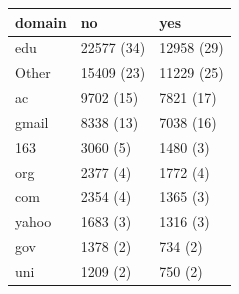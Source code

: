 \begin{table}[ht]
\centering
\begin{tabular}{lll}
 domain & no & yes \\ 
  \hline
edu & 22577 (34) & 12958 (29) \\ 
  Other & 15409 (23) & 11229 (25) \\ 
  ac & 9702 (15) & 7821 (17) \\ 
  gmail & 8338 (13) & 7038 (16) \\ 
  163 & 3060 (5) & 1480 (3) \\ 
  org & 2377 (4) & 1772 (4) \\ 
  com & 2354 (4) & 1365 (3) \\ 
  yahoo & 1683 (3) & 1316 (3) \\ 
  gov & 1378 (2) & 734 (2) \\ 
  uni & 1209 (2) & 750 (2) \\ 
  \end{tabular}
\end{table}
